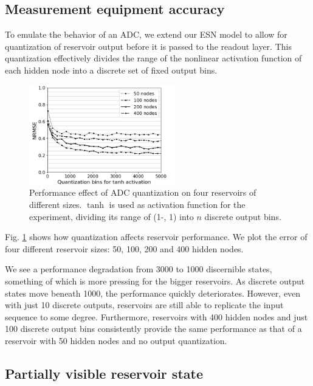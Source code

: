 \subsection{Measurement equipment accuracy}

To emulate the behavior of an ADC, we extend our ESN model to allow for
quantization of reservoir output before it is passed to the readout layer. This
quantization effectively divides the range of the nonlinear activation function
of each hidden node into a discrete set of fixed output bins.

\begin{figure}[H]
  \centering
  \includegraphics[width=2.5in]{img/adc_quantization.png}
  \caption{
    Performance effect of ADC quantization on four reservoirs of different
sizes. $\tanh$ is used as activation function for the experiment, dividing its
range of (1-, 1) into $n$ discrete output bins.
  }
  \label{adc_quantization}
\end{figure}


Fig. \ref{adc_quantization} shows how quantization affects reservoir
performance. We plot the error of four different reservoir sizes: 50, 100, 200
and 400 hidden nodes.

We see a performance degradation from 3000 to 1000 discernible states, something
of which is more pressing for the bigger reservoirs. As discrete output states
move beneath 1000, the performance quickly deteriorates. However, even with just
10 discrete outputs, reservoirs are still able to replicate the input sequence
to some degree. Furthermore, reservoirs with 400 hidden nodes and just 100
discrete output bins consistently provide the same performance as that of a
reservoir with 50 hidden nodes and no output quantization.


\subsection{Partially visible reservoir state}

